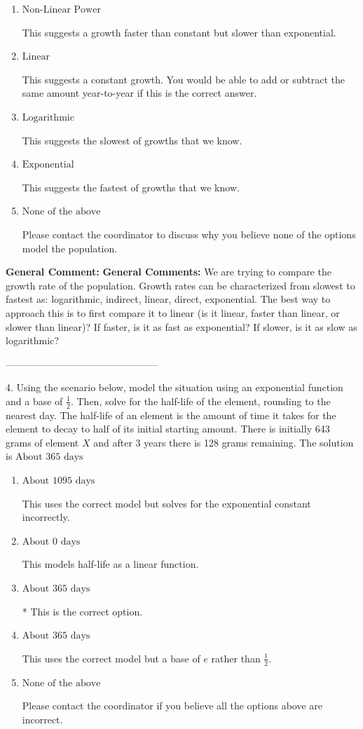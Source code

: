 \documentclass{extbook}[14pt]
\begin{document}
\begin{enumerate}[label=\Alph*.] 
\item $ \text{Non-Linear Power} $ 

 This suggests a growth faster than constant but slower than exponential. 
\item $ \text{Linear} $ 

 This suggests a constant growth. You would be able to add or subtract the same amount year-to-year if this is the correct answer. 
\item $ \text{Logarithmic} $ 

 This suggests the slowest of growths that we know. 
\item $ \text{Exponential} $ 

 This suggests the fastest of growths that we know. 
\item $ \text{None of the above} $ 

 Please contact the coordinator to discuss why you believe none of the options model the population. 
\end{enumerate} 
 
\textbf{General Comment:} \textbf{General Comments:} We are trying to compare the growth rate of the population. Growth rates can be characterized from slowest to fastest as: logarithmic, indirect, linear, direct, exponential. The best way to approach this is to first compare it to linear (is it linear, faster than linear, or slower than linear)? If faster, is it as fast as exponential? If slower, is it as slow as logarithmic? 

-----------------------------------------------

4. Using the scenario below, model the situation using an exponential function and a base of $\frac{1}{2}$. Then, solve for the half-life of the element, rounding to the nearest day.
The half-life of an element is the amount of time it takes for the element to decay to half of its initial starting amount. There is initially 643 grams of element $X$ and after 3 years there is 128 grams remaining. 
The solution is $ \text{About } 365 \text{ days} $ 

\begin{enumerate}[label=\Alph*.] 
\item $ \text{About } 1095 \text{ days} $ 

 This uses the correct model but solves for the exponential constant incorrectly. 
\item $ \text{About } 0 \text{ days} $ 

 This models half-life as a linear function. 
\item $ \text{About } 365 \text{ days} $ 

 * This is the correct option. 
\item $ \text{About } 365 \text{ days} $ 

 This uses the correct model but a base of $e$ rather than $\frac{1}{2}$. 
\item $ \text{None of the above} $ 

 Please contact the coordinator if you believe all the options above are incorrect. 
\end{enumerate} 
 
\end{document}

